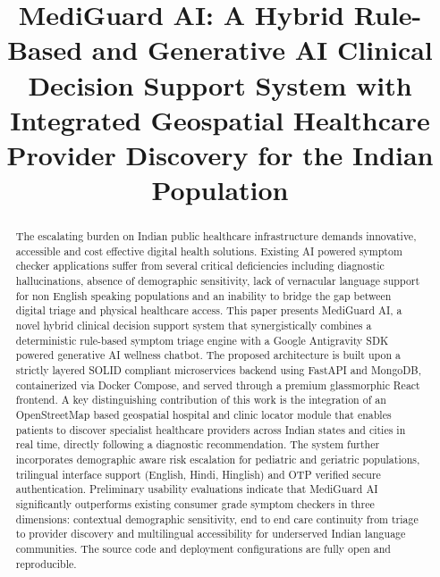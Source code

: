 \documentclass[conference]{IEEEtran}
\begin{document}
\title{MediGuard AI: A Hybrid Rule-Based and Generative AI Clinical Decision Support System with Integrated Geospatial Healthcare Provider Discovery for the Indian Population}

\author{
}

\maketitle

\begin{abstract}
The escalating burden on Indian public healthcare infrastructure demands innovative, accessible and cost effective digital health solutions. Existing AI powered symptom checker applications suffer from several critical deficiencies including diagnostic hallucinations, absence of demographic sensitivity, lack of vernacular language support for non English speaking populations and an inability to bridge the gap between digital triage and physical healthcare access. This paper presents MediGuard AI, a novel hybrid clinical decision support system that synergistically combines a deterministic rule-based symptom triage engine with a Google Antigravity SDK powered generative AI wellness chatbot. The proposed architecture is built upon a strictly layered SOLID compliant microservices backend using FastAPI and MongoDB, containerized via Docker Compose, and served through a premium glassmorphic React frontend. A key distinguishing contribution of this work is the integration of an OpenStreetMap based geospatial hospital and clinic locator module that enables patients to discover specialist healthcare providers across Indian states and cities in real time, directly following a diagnostic recommendation. The system further incorporates demographic aware risk escalation for pediatric and geriatric populations, trilingual interface support (English, Hindi, Hinglish) and OTP verified secure authentication. Preliminary usability evaluations indicate that MediGuard AI significantly outperforms existing consumer grade symptom checkers in three dimensions: contextual demographic sensitivity, end to end care continuity from triage to provider discovery and multilingual accessibility for underserved Indian language communities. The source code and deployment configurations are fully open and reproducible.
\end{abstract}
\end{document}
